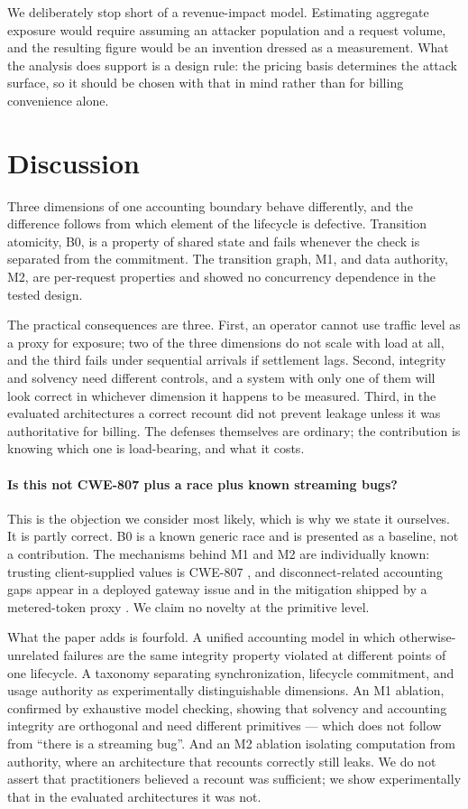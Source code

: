 \documentclass[preprint,3p,authoryear,12pt]{elsarticle}
\begin{document}
We deliberately stop short of a revenue-impact model. Estimating aggregate exposure
would require assuming an attacker population and a request volume, and the resulting
figure would be an invention dressed as a measurement. What the analysis does support is
a design rule: the pricing basis determines the attack surface, so it should be chosen
with that in mind rather than for billing convenience alone.

\section{Discussion}
\label{sec:discussion}
Three dimensions of one accounting boundary behave differently, and the difference
follows from which element of the lifecycle is defective. Transition atomicity, B0, is a
property of shared state and fails whenever the check is separated from the commitment.
The transition graph, M1, and data authority, M2, are per-request properties and showed
no concurrency dependence in the tested design.

The practical consequences are three. First, an operator cannot use traffic level as a
proxy for exposure; two of the three dimensions do not scale with load at all, and the
third fails under sequential arrivals if settlement lags. Second, integrity and solvency
need different controls, and a system with only one of them will look correct in
whichever dimension it happens to be measured. Third, in the evaluated architectures a
correct recount did not prevent leakage unless it was authoritative for billing. The
defenses themselves are ordinary; the contribution is knowing which one is load-bearing,
and what it costs.

\paragraph{Is this not CWE-807 plus a race plus known streaming bugs?}
This is the objection we consider most likely, which is why we state it ourselves. It is
partly correct. B0 is a known generic race and is presented as a baseline, not a
contribution. The mechanisms behind M1 and M2 are individually known: trusting
client-supplied values is CWE-807 \citep{cwe807}, and disconnect-related accounting gaps
appear in a deployed gateway issue \citep{newapi5235} and in the mitigation shipped by a
metered-token proxy \citep{aperture247}. We claim no novelty at the primitive level.

What the paper adds is fourfold. A unified accounting model in which
otherwise-unrelated failures are the same integrity property violated at different
points of one lifecycle. A taxonomy separating synchronization, lifecycle commitment, and
usage authority as experimentally distinguishable dimensions. An M1 ablation, confirmed
by exhaustive model checking, showing that solvency and accounting integrity are
orthogonal and need different primitives --- which does not follow from ``there is a
streaming bug''. And an M2 ablation isolating computation from authority, where an
architecture that recounts correctly still leaks. We do not assert that practitioners
believed a recount was sufficient; we show experimentally that in the evaluated
architectures it was not.
\end{document}
